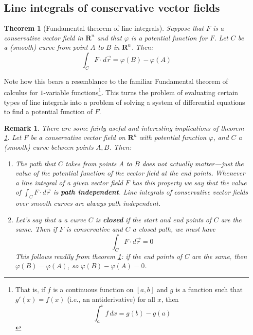 \documentclass[12pt]{article}
\numberwithin{equation}{subsection}
\numberwithin{figure}{subsection}
\newtheorem{thm}[subsection]{Theorem}
\theoremstyle{note}
\newtheorem{remark}[subsection]{Remark}
\begin{document}
{\subsection{Line integrals of conservative vector fields}

\begin{thm}[Fundamental theorem of line integrals] \label{ftc-line-int} Suppose that $F$ is a conservative vector field in $\mathbf{R}^n$ and that $\varphi$ is a potential function for $F$. Let $C$ be a (smooth) curve from point $A$ to $B$ in $\mathbf{R}^n$. Then: \begin{equation} \label{ftc} \int_C F \cdot d\vec{r}= \varphi(B)-\varphi(A)\end{equation}
\end{thm}
Note how this bears a resemblance to the familiar Fundamental theorem of calculus for $1$-variable functions\footnote{That is, if $f$ is a continuous function on $[a,b]$ and $g$ is a function such that $g'(x)=f(x)$ (i.e., an antiderivative) for all $x$, then \[\int_a^b f\,dx=g(b)-g(a)\]}. This turns the problem of evaluating certain types of line integrals into a problem of solving a system of differential equations to find a potential function of $F$. 


\begin{remark} There are some fairly useful and interesting implications of theorem \ref{ftc-line-int}. Let $F$ be a conservative vector field on $\mathbf{R}^n$ with potential function $\varphi$, and $C$ a (smooth) curve between points $A,B$. Then: 
\begin{enumerate}[label=\roman*.]
	\item The \textit{path} that $C$ takes from points $A$ to $B$ does not actually matter---just the value of the potential function of the vector field at the end points. Whenever a line integral of a given vector field $F$ has this property we say that the value of $\int_C F\cdot d\vec{r}$ is  \textbf{path independent}. Line integrals of conservative vector fields over smooth curves are always path independent. 
	
	\item \label{closed-path-int} Let's say that a a curve $C$ is \textbf{closed} if the start and end points of $C$ are the same. Then if $F$ is conservative and $C$ a closed path, we must have \begin{equation} \int_C F \cdot d\vec{r}=0\end{equation} This follows readily from theorem \ref{ftc-line-int}: if the end points of $C$ are the same, then $\varphi(B)=\varphi(A)$, so $\varphi(B)-\varphi(A)=0$. 
	

\end{enumerate}
\end{remark}}
\end{document}

